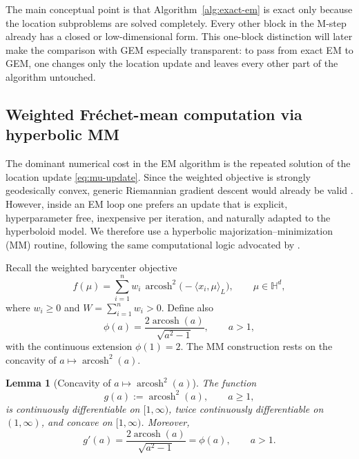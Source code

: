 \documentclass[11pt]{article}
\newtheorem{lemma}[theorem]{Lemma}
\begin{document}
The main conceptual point is that Algorithm~\ref{alg:exact-em} is exact only because the location subproblems are solved completely. Every other block in the M-step already has a closed or low-dimensional form. This one-block distinction will later make the comparison with GEM especially transparent: to pass from exact EM to GEM, one changes only the location update and leaves every other part of the algorithm untouched.

\subsection{Weighted Fr\'echet-mean computation via hyperbolic MM}\label{subsec:mm-barycenter}

The dominant numerical cost in the EM algorithm is the repeated solution of the location update \eqref{eq:mu-update}. Since the weighted \Frechet objective is strongly geodesically convex, generic Riemannian gradient descent would already be valid \citep{boumal_2023_IntroductionOptimizationSmooth}. However, inside an EM loop one prefers an update that is explicit, hyperparameter free, inexpensive per iteration, and naturally adapted to the hyperboloid model. We therefore use a hyperbolic majorization--minimization (MM) routine, following the same computational logic advocated by \cite{lou_2020_DifferentiatingFrechetMean}.

Recall the weighted barycenter objective
\begin{equation}\label{eq:barycenter-objective}
f(\mu)
=
\sum_{i=1}^n w_i\,\operatorname{arcosh}^2\bigl(-\langle x_i,\mu\rangle_L\bigr),
\qquad \mu\in\mathbb{H}^d,
\end{equation}
where \(w_i\ge 0\) and \(W=\sum_{i=1}^n w_i>0\). Define also
\begin{equation}\label{eq:mm-phi-def}
\phi(a)
=
\frac{2\operatorname{arcosh}(a)}{\sqrt{a^2-1}},
\qquad a>1,
\end{equation}
with the continuous extension \(\phi(1)=2\). The MM construction rests on the concavity of \(a\mapsto \operatorname{arcosh}^2(a)\).

\begin{lemma}[Concavity of \(a\mapsto \operatorname{arcosh}^2(a)\)]\label{lem:mm-concavity}
The function
\[
g(a):=\operatorname{arcosh}^2(a),\qquad a\ge 1,
\]
is continuously differentiable on \([1,\infty)\), twice continuously differentiable on \((1,\infty)\), and concave on \([1,\infty)\). Moreover,
\begin{equation}\label{eq:mm-gprime}
g'(a)=\frac{2\operatorname{arcosh}(a)}{\sqrt{a^2-1}}=\phi(a),
\qquad a>1.
\end{equation}
\end{lemma}
\end{document}
